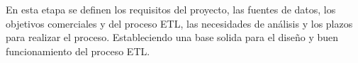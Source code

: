 En esta etapa se definen los requisitos del proyecto, las fuentes de datos, los objetivos comerciales y del proceso ETL, las necesidades de análisis y los plazos para realizar el proceso. Estableciendo una base solida para el diseño y buen funcionamiento del proceso ETL.
